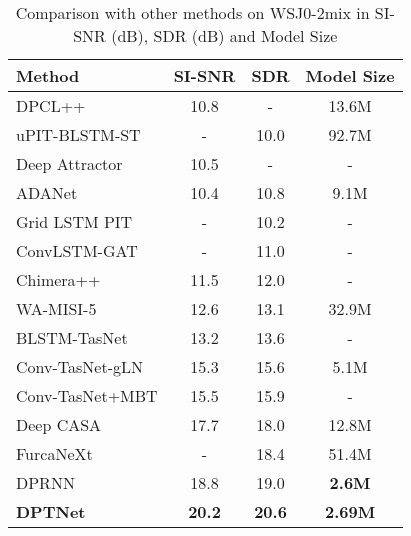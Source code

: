 \documentclass[a4paper]{article}
\begin{document}
\begin{table}[t]
  \caption{Comparison with other methods on WSJ0-2mix in SI-SNR (dB), SDR (dB) and Model Size}
  \label{tab:results_1}
  \centering
  \begin{tabular}{lccc}
    \toprule
    \textbf{Method}      & \textbf{SI-SNR}      & \textbf{SDR}      & \textbf{Model Size}\\
    \midrule
    DPCL++ \cite{isik2016single}                   & 10.8            & -               & 13.6M\\
    uPIT-BLSTM-ST \cite{kolbaek2017multitalker}    & -               & 10.0            & 92.7M\\
    Deep Attractor \cite{chen2017deep}             & 10.5            & -               & -\\
    ADANet \cite{luo2018speaker}                   & 10.4            & 10.8            & 9.1M\\
    Grid LSTM PIT \cite{xu2018single}              & -               & 10.2            & -\\
    ConvLSTM-GAT \cite{li2018cbldnn}               & -               & 11.0            & -\\
    Chimera++ \cite{wang2018alternative}           & 11.5            & 12.0            & -\\
    WA-MISI-5 \cite{wang2018end}                   & 12.6            & 13.1            & 32.9M\\
    BLSTM-TasNet \cite{luo2018tasnet}              & 13.2            & 13.6            & -\\
    Conv-TasNet-gLN \cite{luo2019conv}             & 15.3            & 15.6            & 5.1M\\
    Conv-TasNet+MBT \cite{lam2019mixup}            & 15.5            & 15.9            & -\\
Deep CASA \cite{liu2019divide}                 & 17.7            & 18.0            & 12.8M\\
    FurcaNeXt \cite{zhang2020furcanext}            & -               & 18.4            & 51.4M\\
    DPRNN \cite{luo2019dual}                       & 18.8            & 19.0            & \textbf{2.6M}\\
\midrule
    \textbf{DPTNet}                                & \textbf{20.2}   & \textbf{20.6}   & \textbf{2.69M}\\
    \bottomrule
  \end{tabular}
\end{table}
\end{document}
